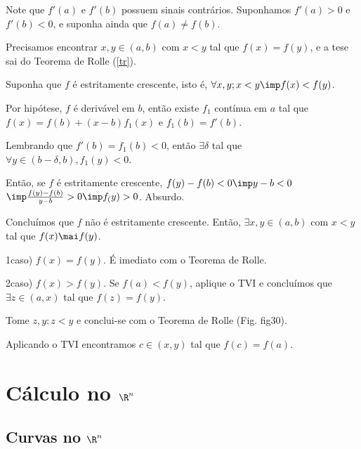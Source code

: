 \documentclass{book}
\begin{document}
\begin{sol}
Note que $f'(a)$ e $f'(b)$ possuem sinais contr\'arios. Suponhamos $f'(a) > 0$ e $f'(b) < 0$, e suponha ainda que $f(a) \ne f(b)$.

\begin{figure}[!h]
  \centering
  \subfloat[fig29]{
    
    \label{fig29}
  }
  \quad
  \subfloat[fig30]{
    
    \label{fig30}
  }
\end{figure}

Precisamos encontrar $x,y \in (a,b)$ com $x < y$ tal que $f(x) = f(y)$, e a tese sai do Teorema de Rolle (\ref{tr}).

Suponha que $f$ \'e estritamente crescente, isto \'e, $\forall x,y; x < y \imp f(x) < f(y)$.

\begin{sloppypar}
Por hip\'otese, $f$ \'e deriv\'avel em $b$, ent\~ao existe $f_1$ cont\'inua em $a$ tal que ${f(x) = f(b) + (x - b)f_1(x)}$ e $f_1(b) = f'(b)$.
\end{sloppypar}

Lembrando que $f'(b) = f_1(b) < 0$, ent\~ao $\exists \delta$ tal que $\forall y \in (b - \delta,b), f_1(y) < 0$.

Ent\~ao, se $f$ \'e estritamente crescente, $f(y) - f(b) < 0 \imp y - b < 0$ \\
$\imp \frac{f(y) - f(b)}{y - b} > 0 \imp f_(y) > 0$. Absurdo.

Conclu\'imos que $f$ n\~ao \'e estritamente crescente. Ent\~ao, $\exists x,y \in (a,b)$ com $x < y$ tal que $f(x) \mai f(y)$.

1\textordmasculine caso) $f(x) = f(y)$. \'E imediato com o Teorema de Rolle.

2\textordmasculine caso) $f(x) > f(y)$. Se $f(a) < f(y)$, aplique o TVI e conclu\'imos que $\exists z \in (a,x)$ tal que $f(z) = f(y)$.

Tome $z,y: z < y$ e conclui-se com o Teorema de Rolle (Fig. fig30).

Aplicando o TVI encontramos $c \in (x,y)$ tal que $f(c) = f(a)$.

\end{sol}





\chapter{C\'alculo no $\R^n$} \label{chap02}

\section{Curvas no $\R^n$} \label{sec07}
\end{document}
